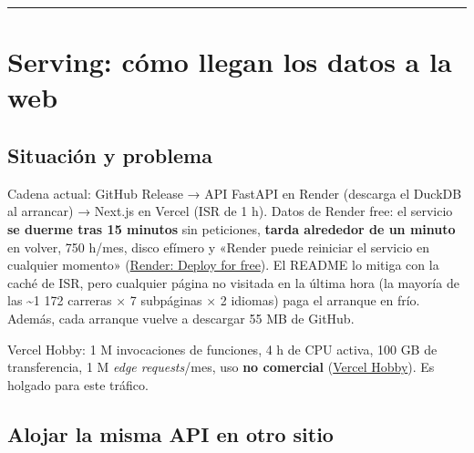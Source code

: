 \medskip\noindent\textcolor{muted!40}{\rule{\linewidth}{0.3pt}}\medskip

\section{Serving: cómo llegan los datos a la web}

\subsection{Situación y problema}

Cadena actual: GitHub Release → API FastAPI en Render (descarga el DuckDB al arrancar) → Next.js en Vercel (ISR de 1 h). Datos de Render free: el servicio \textbf{se duerme tras 15 minutos} sin peticiones, \textbf{tarda alrededor de un minuto} en volver, 750 h/mes, disco efímero y «Render puede reiniciar el servicio en cualquier momento» (\href{https://render.com/docs/free}{Render: Deploy for free}). El README lo mitiga con la caché de ISR, pero cualquier página no visitada en la última hora (la mayoría de las \textasciitilde{}1 172 carreras × 7 subpáginas × 2 idiomas) paga el arranque en frío. Además, cada arranque vuelve a descargar 55 MB de GitHub.

Vercel Hobby: 1 M invocaciones de funciones, 4 h de CPU activa, 100 GB de transferencia, 1 M \emph{edge requests}/mes, uso \textbf{no comercial} (\href{https://vercel.com/docs/plans/hobby}{Vercel Hobby}). Es holgado para este tráfico.

\subsection{Alojar la misma API en otro sitio}

